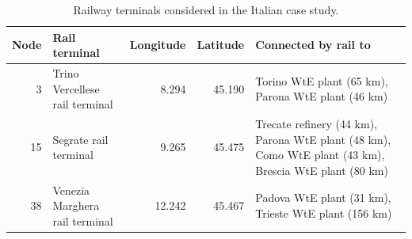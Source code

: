 \begin{table}[ht]
\centering
\small
\caption{Railway terminals considered in the Italian case study.}
\label{tab:rail_terminals}
\begin{tabular}{rlrrp{6cm}}
\hline
Node & Rail terminal & Longitude & Latitude & Connected by rail to \\
\hline
3 & Trino Vercellese rail terminal & 8.294 & 45.190 & Torino WtE plant (65 km), Parona WtE plant (46 km) \\
15 & Segrate rail terminal & 9.265 & 45.475 & Trecate refinery (44 km), Parona WtE plant (48 km), Como WtE plant (43 km), Brescia WtE plant (80 km) \\
38 & Venezia Marghera rail terminal & 12.242 & 45.467 & Padova WtE plant (31 km), Trieste WtE plant (156 km) \\
\hline
\end{tabular}
\end{table}
